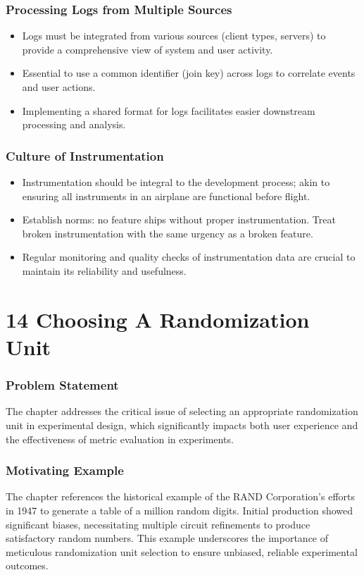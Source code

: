 \documentclass{article}
\begin{document}
\subsubsection*{Processing Logs from Multiple Sources}
\begin{itemize}
    \item Logs must be integrated from various sources (client types, servers) to provide a comprehensive view of system and user activity.
    \item Essential to use a common identifier (join key) across logs to correlate events and user actions.
    \item Implementing a shared format for logs facilitates easier downstream processing and analysis.
\end{itemize}

\subsubsection*{Culture of Instrumentation}
\begin{itemize}
    \item Instrumentation should be integral to the development process; akin to ensuring all instruments in an airplane are functional before flight.
    \item Establish norms: no feature ships without proper instrumentation. Treat broken instrumentation with the same urgency as a broken feature.
    \item Regular monitoring and quality checks of instrumentation data are crucial to maintain its reliability and usefulness.
\end{itemize}

\section*{14 Choosing A Randomization Unit}
\subsubsection*{Problem Statement}
The chapter addresses the critical issue of selecting an appropriate randomization unit in experimental design, which significantly impacts both user experience and the effectiveness of metric evaluation in experiments.

\subsubsection*{Motivating Example}
The chapter references the historical example of the RAND Corporation's efforts in 1947 to generate a table of a million random digits. Initial production showed significant biases, necessitating multiple circuit refinements to produce satisfactory random numbers. This example underscores the importance of meticulous randomization unit selection to ensure unbiased, reliable experimental outcomes.
\end{document}
